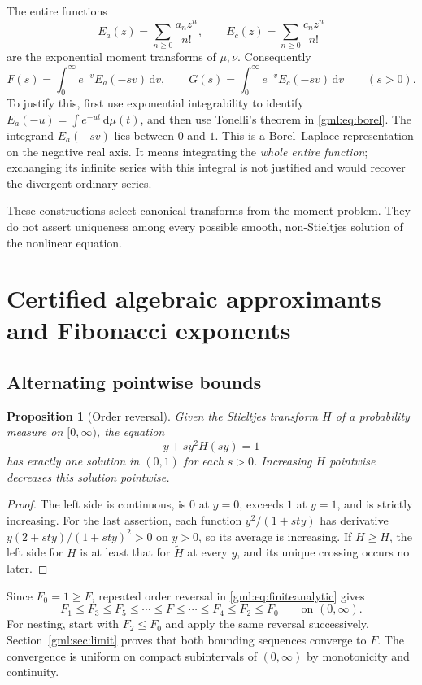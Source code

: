 \documentclass[11pt]{article}
\numberwithin{equation}{section}
\newtheorem{proposition}[theorem]{Proposition}
\theoremstyle{definition}
\theoremstyle{remark}
\newcommand{\dd}{\,\mathrm d}
\begin{document}
The entire functions
\[
 E_a(z)=\sum_{n\ge0}\frac{a_nz^n}{n!},\qquad
 E_c(z)=\sum_{n\ge0}\frac{c_nz^n}{n!}
\]
are the exponential moment transforms of $\mu,\nu$. Consequently
\begin{equation}\label{gml:eq:borel}
 F(s)=\int_0^\infty e^{-v}E_a(-sv)\dd v,
 \qquad G(s)=\int_0^\infty e^{-v}E_c(-sv)\dd v\qquad(s>0).
\end{equation}
To justify this, first use exponential integrability to identify
$E_a(-u)=\int e^{-ut}\dd\mu(t)$, and then use Tonelli's theorem in
\eqref{gml:eq:borel}. The integrand $E_a(-sv)$ lies between $0$ and $1$.
This is a Borel--Laplace representation on the negative real axis.
It means integrating the \emph{whole entire function}; exchanging its
infinite series with this integral is not justified and would recover
the divergent ordinary series.

These constructions select canonical transforms from the moment problem.
They do not assert uniqueness among every possible smooth, non-Stieltjes
solution of the nonlinear equation.

\section{Certified algebraic approximants and Fibonacci exponents}\label{gml:sec:approximants}
\subsection{Alternating pointwise bounds}
\begin{proposition}[Order reversal]\label{gml:prop:order}
Given the Stieltjes transform $H$ of a probability measure on $[0,\infty)$,
the equation
\begin{equation}\label{gml:eq:rootmap}
 y+sy^2H(sy)=1
\end{equation}
has exactly one solution in $(0,1)$ for each $s>0$. Increasing $H$
pointwise decreases this solution pointwise.
\end{proposition}
\begin{proof}
The left side is continuous, is $0$ at $y=0$, exceeds $1$ at $y=1$, and
is strictly increasing. For the last assertion, each function
$y^2/(1+sty)$ has derivative
$y(2+sty)/(1+sty)^2>0$ on $y>0$, so its average is increasing.
If $H\ge\widetilde H$, the left side for $H$ is at least that for
$\widetilde H$ at every $y$, and its unique crossing occurs no later.
\end{proof}

Since $F_0=1\ge F$, repeated order reversal in
\eqref{gml:eq:finiteanalytic} gives
\begin{equation}\label{gml:eq:brackets}
 F_1\le F_3\le F_5\le\cdots\le F
 \le\cdots\le F_4\le F_2\le F_0
 \qquad\text{on }(0,\infty).
\end{equation}
For nesting, start with $F_2\le F_0$ and apply the same reversal
successively. Section~\ref{gml:sec:limit} proves that both bounding sequences
converge to $F$. The convergence is uniform on compact subintervals of
$(0,\infty)$ by monotonicity and continuity.
\end{document}
